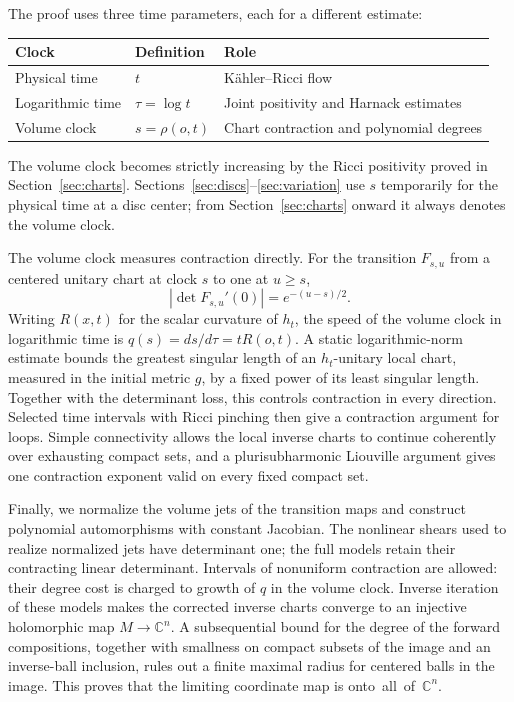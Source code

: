 \documentclass[11pt]{article}
\theoremstyle{definition}
\theoremstyle{remark}
\newcommand{\C}{\mathbb C}
\numberwithin{equation}{section}
\begin{document}
The proof uses three time parameters, each for a different estimate:
\begin{center}
\begin{tabular}{lll}
\toprule
Clock & Definition & Role \\
\midrule
Physical time & $t$ & K\"ahler--Ricci flow \\
Logarithmic time & $\tau=\log t$ & Joint positivity and Harnack estimates \\
Volume clock & $s=\rho(o,t)$ & Chart contraction and polynomial degrees \\
\bottomrule
\end{tabular}
\end{center}
The volume clock becomes strictly increasing by the Ricci positivity
proved in Section~\ref{sec:charts}.  Sections~\ref{sec:discs}--\ref{sec:variation}
use $s$ temporarily for the physical time at a disc center; from
Section~\ref{sec:charts} onward it always denotes the volume clock.

The volume clock measures contraction directly.  For the transition
$F_{s,u}$ from a centered unitary chart at clock $s$ to one at $u\ge s$,
\[
 |\det F_{s,u}'(0)|=e^{-(u-s)/2}.
\]
Writing $R(x,t)$ for the scalar curvature of $h_t$, the speed of the
volume clock in logarithmic time is $q(s)=ds/d\tau=tR(o,t)$.
A static logarithmic-norm estimate bounds the greatest singular length
of an $h_t$-unitary local chart, measured in the initial metric $g$,
by a fixed power of its least singular length.  Together with the
determinant loss, this controls contraction in every direction.
Selected time intervals with Ricci pinching then give a contraction
argument for loops.  Simple connectivity allows the local inverse
charts to continue coherently over exhausting compact sets, and a
plurisubharmonic Liouville argument gives one contraction exponent
valid on every fixed compact set.

Finally, we normalize the volume jets of the transition maps and
construct polynomial automorphisms with constant Jacobian.  The
nonlinear shears used to realize normalized jets have determinant
one; the full models retain their contracting linear determinant.
Intervals of nonuniform contraction are allowed: their degree
cost is charged to growth of $q$ in the volume clock.
Inverse iteration of these models makes the corrected inverse charts
converge to an injective holomorphic map $M\to\C^n$.
A subsequential bound for the degree of the forward compositions,
together with smallness on compact subsets of the image and an
inverse-ball inclusion, rules out a finite maximal radius for centered
balls in the image.
This proves that the limiting coordinate map is onto~all~of~$\C^n$.
\end{document}
